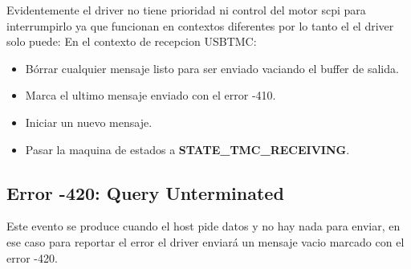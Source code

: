 Evidentemente el driver no tiene prioridad ni control del motor scpi para interrumpirlo ya que funcionan en contextos diferentes por lo tanto el el driver solo puede:
En el contexto de recepcion USBTMC: 
\begin{itemize}
    \item Bórrar cualquier mensaje listo para ser enviado vaciando el buffer de salida.
    \item Marca el ultimo mensaje enviado con el error -410.
    \item Iniciar un nuevo mensaje. 
    \item Pasar la maquina de estados a \textbf{STATE\_TMC\_RECEIVING}.
\end{itemize}

\subsection{Error -420: Query Unterminated}
Este evento se produce cuando el host pide datos y no hay nada para enviar, en ese caso para reportar el error el driver enviará un mensaje vacio marcado con el error -420.